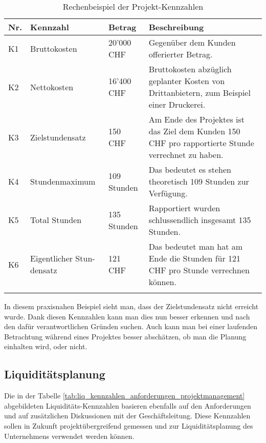 \begin{center}
    \begin{longtable}{lp{3cm}p{3cm}p{7cm}}
        \toprule \textbf{Nr.} & \textbf{Kennzahl} & \textbf{Betrag} & \textbf{Beschreibung} \\
        \midrule K1 & Bruttokosten & 20'000 CHF & 
            Gegenüber dem Kunden offerierter Betrag. \\
        \midrule K2 & Nettokosten & 16'400 CHF &
            Bruttokosten abzüglich geplanter Kosten von Drittanbietern, zum
            Beispiel einer Druckerei.\\
        \midrule K3 & Zielstundensatz & 150 CHF & 
            Am Ende des Projektes ist das Ziel dem Kunden 150 CHF pro rapportierte
            Stunde verrechnet zu haben. \\
        \midrule K4 & Stundenmaximum & 109 Stunden & 
            Das bedeutet es stehen theoretisch 109 Stunden zur Verfügung. \\
        \midrule K5 & Total Stunden & 135 Stunden & 
            Rapportiert wurden schlussendlich insgesamt 135 Stunden. \\
        \midrule K6 & Eigentlicher Stun- densatz & 121 CHF & 
            Das bedeutet man hat am Ende die Stunden für 121 CHF pro Stunde
            verrechnen können. \\
        \bottomrule
        \caption[Rechenbeispiel der Projekt-Kennzahlen]{Rechenbeispiel der 
            Projekt-Kennzahlen\footnotemark}
        \label{tab:proj_kennzahlen_anforderungen_projektmanagement_bsp}
    \end{longtable}
\end{center}

In diesem praxisnahen Beispiel sieht man, dass der Zielstundensatz nicht erreicht
wurde. Dank diesen Kennzahlen kann man dies nun besser erkennen und nach den 
dafür verantwortlichen Gründen suchen. Auch kann man bei einer laufenden 
Betrachtung während eines Projektes besser abschätzen, ob man die Planung
einhalten wird, oder nicht.

\subsection{Liquiditätsplanung}
Die in der Tabelle \ref{tab:liq_kennzahlen_anforderungen_projektmanagement} abgebildeten
Liquiditäts-Kennzahlen basieren ebenfalls auf den Anforderungen und auf zusätzlichen
Diskussionen mit der Geschäftsleitung. Diese Kennzahlen sollen in Zukunft
projektübergreifend gemessen und zur Liquiditätsplanung des Unternehmens
verwendet werden können.

